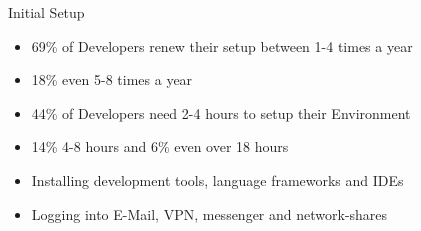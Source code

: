 \documentclass{beamer}
\begin{document}
\begin{frame}{}
  \begin{center}
    \Large Initial Setup
  \end{center}

  \begin{block}{}
    \begin{itemize}
      \small
      \setlength\itemsep{0em}
      \item 69\% of Developers renew their setup between 1-4 times a year
      \item 18\% even 5-8 times a year
    \end{itemize}
  \end{block}

  \begin{block}{}
    \begin{itemize}
      \small
      \setlength\itemsep{0em}
      \item 44\% of Developers need 2-4 hours to setup their Environment
      \item 14\% 4-8 hours and 6\% even over 18 hours
    \end{itemize}
  \end{block}

  \begin{block}{}
    \begin{itemize}
      \small
      \setlength\itemsep{0em}
      \item Installing development tools, language frameworks and IDEs
      \item Logging into E-Mail, VPN, messenger and network-shares
    \end{itemize}
  \end{block}
\end{frame}
\end{document}
